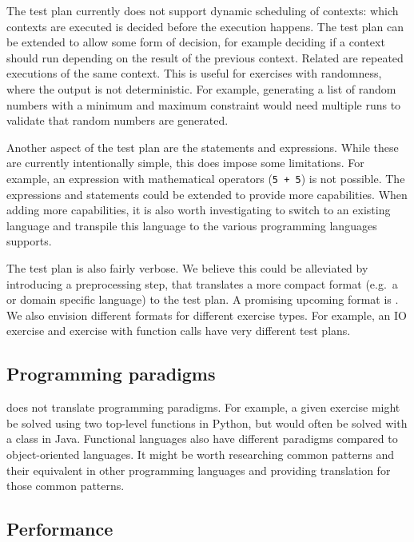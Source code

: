 \documentclass[5p,number]{elsarticle}
\begin{document}
    The test plan currently does not support dynamic scheduling of contexts: which contexts are executed is decided before the execution happens.
    The test plan can be extended to allow some form of decision, for example deciding if a context should run depending on the result of the previous context.
    Related are repeated executions of the same context.
    This is useful for exercises with randomness, where the output is not deterministic.
    For example, generating a list of random numbers with a minimum and maximum constraint would need multiple runs to validate that random numbers are generated.
    
    Another aspect of the test plan are the statements and expressions.
    While these are currently intentionally simple, this does impose some limitations.
    For example, an expression with mathematical operators (\texttt{5 + 5}) is not possible.
    The expressions and statements could be extended to provide more capabilities.
    When adding more capabilities, it is also worth investigating to switch to an existing language and transpile this language to the various programming languages \tested{} supports.
    
    The test plan is also fairly verbose.
    We believe this could be alleviated by introducing a preprocessing step, that translates a more compact format (e.g.\ a  or domain specific language) to the test plan.
    A promising upcoming format is  \cite{peml}.
    We also envision different formats for different exercise types.
    For example, an IO exercise and exercise with function calls have very different test plans.
    
    \subsection{Programming paradigms}\label{subsec:programming-paradigms}

    \tested{} does not translate programming paradigms.
    For example, a given exercise might be solved using two top-level functions in Python, but would often be solved with a class in Java.
    Functional languages also have different paradigms compared to object-oriented languages.
    It might be worth researching common patterns and their equivalent in other programming languages and providing translation for those common patterns.
    
    \subsection{Performance}\label{subsec:performance}
\end{document}

